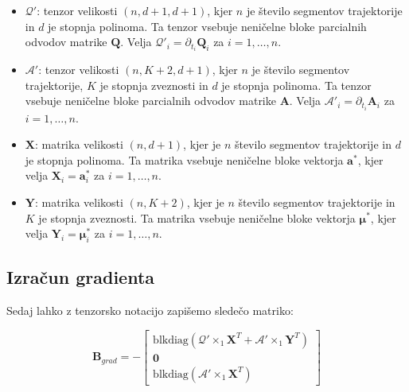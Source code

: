 \documentclass[isrm2, tisk]{fmfdelo}
\newcommand{\qmat}{\mathbf{Q}}
\newcommand{\amat}{\mathbf{A}}
\newcommand{\avec}{\mathbf{a}}
\newcommand{\muvec}{\boldsymbol{\mu}}
\begin{document}
\begin{itemize}
    \item $\mathcal{Q'}$: tenzor velikosti $(n, d+1, d+1)$, kjer $n$ je število segmentov trajektorije in $d$ je stopnja polinoma. Ta tenzor vsebuje neničelne bloke parcialnih odvodov matrike $\qmat$. Velja $\mathcal{Q'}_i = \partial_{t_i} \qmat_i$ za $i=1,\ldots,n$.
    \item $\mathcal{A'}$: tenzor velikosti $(n, K+2, d+1)$, kjer $n$ je število segmentov trajektorije, $K$ je stopnja zveznosti in $d$ je stopnja polinoma. Ta tenzor vsebuje neničelne bloke parcialnih odvodov matrike $\amat$. Velja $\mathcal{A'}_i = \partial_{t_i} \amat_i$ za $i=1,\ldots,n$.\footnotemark[1]
    \item $\mathbf{X}$: matrika velikosti $(n, d+1)$, kjer je $n$ število segmentov trajektorije in $d$ je stopnja polinoma. Ta matrika vsebuje neničelne bloke vektorja $\avec^*$, kjer velja $\mathbf{X}_i = \avec^*_i$ za $i=1,\ldots,n$.
    \item $\mathbf{Y}$: matrika velikosti $(n, K+2)$, kjer je $n$ število segmentov trajektorije in $K$ je stopnja zveznosti. Ta matrika vsebuje neničelne bloke vektorja $\muvec^*$, kjer velja $\mathbf{Y}_i = \muvec^*_i$ za $i=1,\ldots,n$.
\end{itemize}


\subsection{Izračun gradienta}
\label{app:grad}

Sedaj lahko z tenzorsko notacijo zapišemo sledečo matriko:

\begin{equation}
\mathbf{B}_{grad} = - \begin{bmatrix}
    \text{blkdiag}\left(\mathcal{Q'} \times_1 \mathbf{X}^T + \mathcal{A'} \times_1 \mathbf{Y}^T\right) \\
    \mathbf{0} \\
    \text{blkdiag}\left(\mathcal{A'} \times_1 \mathbf{X}^T\right)
\end{bmatrix}
\end{equation}
\end{document}
